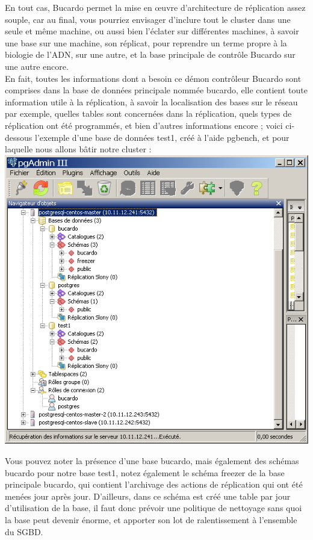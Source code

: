\documentclass[12pt]{report}
\begin{document}
En tout cas, Bucardo permet la mise en œuvre d'architecture de réplication assez
souple, car au final, vous pourriez envisager d'inclure tout le cluster dans une
seule et même machine, ou aussi bien l'éclater sur différentes machines, à
savoir une base sur une machine, son réplicat, pour reprendre un terme propre à
la biologie de l'ADN, sur une autre, et la base principale de contrôle Bucardo
sur une autre encore. \\


En fait, toutes les informations dont a besoin ce démon contrôleur Bucardo sont
comprises dans la base de données principale nommée bucardo, elle contient toute
information utile à la réplication, à savoir la localisation des bases sur le
réseau par exemple, quelles tables sont concernées dans la réplication, quels
types de réplication ont été programmés, et bien d'autres informations encore ;
voici ci-dessous l'exemple d'une base de données test1, créé à l'aide pgbench, et
pour laquelle nous allons bâtir notre cluster : \\

\includegraphics[width=\linewidth]{./pgadmin.png}

Vous pouvez noter la présence d'une base bucardo, mais également des schémas
bucardo pour notre base test1, notez également le schéma freezer de la base
principale bucardo, qui contient l'archivage des actions de réplication qui ont
été menées jour après jour. D'ailleurs, dans ce schéma est créé une table par
jour d'utilisation de la base, il faut donc prévoir une politique de nettoyage
sans quoi la base peut devenir énorme, et apporter son lot de ralentissement à
l'ensemble du SGBD. \\
\end{document}
